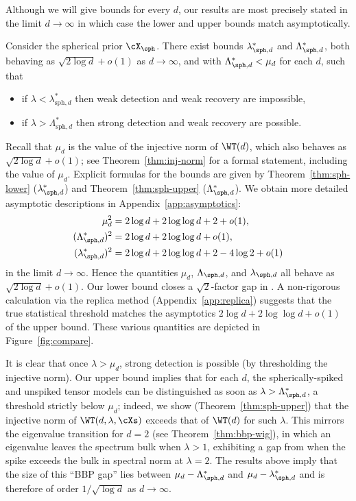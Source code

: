 \documentclass{article}
\begin{document}
\noindent Although we will give bounds for every $d$, our results are most precisely stated in the limit $d \to \infty$ in which case the lower and upper bounds match asymptotically.

\begin{theorem}\label{thm:dinf-spherical} Consider the spherical prior $\cX_\sph$. There exist bounds $\lambda^*_{\sph,d}$ and $\Lambda^*_{\sph,d}$, both behaving as $\sqrt{2 \log d} + o(1)$ as $d \to \infty$, and with $\Lambda^*_{\sph,d} < \mu_d$ for each $d$, such that
\begin{itemize}
    \item if $\lambda < \lambda^*_{\mathrm{sph},d}$ then
    weak detection and weak recovery are impossible,
    \item if $\lambda > \Lambda^*_{\mathrm{sph},d}$ then
    strong detection and weak recovery are possible.
\end{itemize}
\end{theorem}

\noindent Recall that $\mu_d$ is the value of the injective norm of $\WT(d)$, which also behaves as $\sqrt{2\log d} + o(1)$; see Theorem~\ref{thm:inj-norm} for a formal statement, including the value of $\mu_d$. Explicit formulas for the bounds are given by Theorem~\ref{thm:sph-lower} ($\lambda^*_{\sph,d}$) and Theorem~\ref{thm:sph-upper} ($\Lambda^*_{\sph,d}$). We obtain more detailed asymptotic descriptions in Appendix~\ref{app:asymptotics}:
\begin{align*}
    \mu_d^2 &= 2 \log d + 2 \log \log d + 2 + o(1), \\
    (\Lambda_{\sph,d}^*)^2 &= 2 \log d + 2 \log \log d + o(1), \\
    (\lambda_{\sph,d}^*)^2 &= 2 \log d + 2 \log \log d + 2 - 4 \log 2 + o(1)
\end{align*}
in the limit $d \to \infty$. Hence the quantities $\mu_d$, $\Lambda_{\sph,d}$, and $\lambda_{\sph,d}$ all behave as $\sqrt{2 \log d} + o(1)$. Our lower bound closes a $\sqrt{2}$-factor gap in \cite{mrz}. A non-rigorous calculation via the replica method (Appendix~\ref{app:replica}) suggests that the true statistical threshold matches the asymptotics $2 \log d + 2 \log \log d + o(1)$ of the upper bound. These various quantities are depicted in Figure~\ref{fig:compare}.

It is clear that once $\lambda > \mu_d$, strong detection is possible (by thresholding the injective norm). Our upper bound implies that for each $d$, the spherically-spiked and unspiked tensor models can be distinguished as soon as $\lambda > \Lambda^*_{\sph,d}$, a threshold strictly below $\mu_d$; indeed, we show (Theorem~\ref{thm:sph-upper}) that the injective norm of $\WT(d,\lambda,\cXs)$ exceeds that of $\WT(d)$ for such $\lambda$. This mirrors the eigenvalue transition for $d=2$ (see Theorem~\ref{thm:bbp-wig}), in which an eigenvalue leaves the spectrum bulk when $\lambda > 1$, exhibiting a gap from when the spike exceeds the bulk in spectral norm at $\lambda = 2$. The results above imply that the size of this ``BBP gap'' lies between $\mu_d - \Lambda^*_{\sph,d}$ and $\mu_d - \lambda^*_{\sph,d}$ and is therefore of order $1/\sqrt{\log d}$ as $d \to \infty$.
\end{document}
